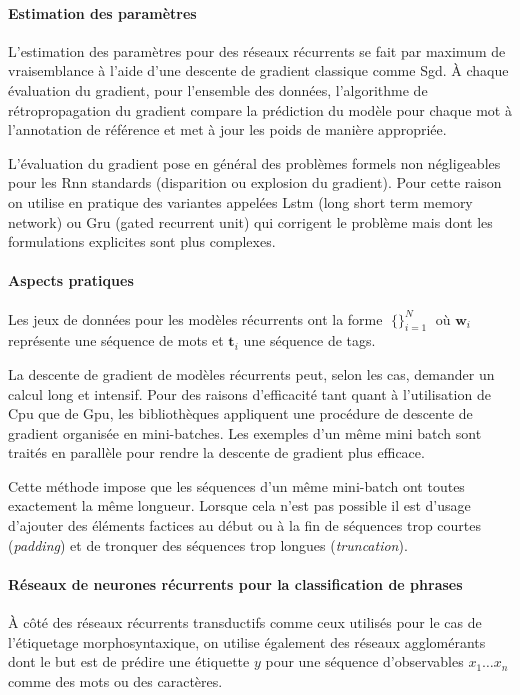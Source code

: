 \documentclass[11pt,openany]{book}
\begin{document}
\paragraph{Estimation des paramètres} L'estimation des paramètres pour
des réseaux récurrents se fait par maximum de vraisemblance à l'aide d'une descente de gradient
classique comme {\sc Sgd}. 
\`A chaque évaluation du gradient, pour l'ensemble des données,
l'algorithme de rétropropagation du gradient compare la prédiction du
modèle pour chaque mot à l'annotation de référence et met à jour les
poids de manière appropriée.

L'évaluation du gradient pose en général des problèmes formels
non négligeables pour les {\sc Rnn} standards (disparition ou explosion du gradient). Pour cette raison on
utilise en pratique des  variantes appelées {\sc Lstm} (long short
term memory network) ou {\sc Gru} (gated recurrent unit)
qui corrigent le problème mais dont les formulations explicites sont plus complexes.


\paragraph{Aspects pratiques}
Les jeux de données pour les modèles récurrents ont la forme $\mathop{\{(\mathbf{w}_i,\mathbf{t}_i)\}}_{i=1}^N$ 
où $\mathbf{w}_i$ représente une séquence de mots et $\mathbf{t}_i$
une séquence de tags. 

La descente de gradient de modèles récurrents peut, selon les cas,
demander un calcul long et intensif.
Pour des raisons d'efficacité tant quant à l'utilisation de {\sc Cpu}
que de {\sc Gpu}, les bibliothèques appliquent une
procédure de descente de gradient organisée en mini-batches. 
Les exemples d'un même mini batch sont traités en parallèle pour
rendre la  descente de gradient plus efficace.

Cette méthode impose que les séquences d'un même mini-batch ont
toutes exactement la même longueur. Lorsque cela n'est pas possible il
est d'usage d'ajouter des éléments factices au début ou à la fin de
séquences trop courtes ({\em padding}) et de tronquer des séquences
trop longues ({\em truncation}).


\paragraph{Réseaux de neurones récurrents pour la classification de phrases}
\`A côté des réseaux récurrents transductifs comme ceux utilisés pour
le cas de l'étiquetage morphosyntaxique, on utilise également des
réseaux agglomérants dont le but est de prédire une étiquette $y$ pour
une séquence d'observables $x_1\ldots x_n$ comme des mots ou des caractères.
\end{document}
